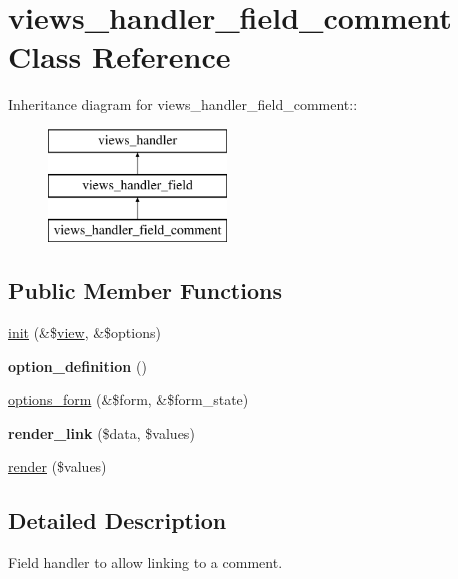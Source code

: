 \hypertarget{classviews__handler__field__comment}{
\section{views\_\-handler\_\-field\_\-comment Class Reference}
\label{classviews__handler__field__comment}
}
Inheritance diagram for views\_\-handler\_\-field\_\-comment::\begin{figure}[H]
\begin{center}
\leavevmode
\includegraphics[height=3cm]{classviews__handler__field__comment}
\end{center}
\end{figure}
\subsection*{Public Member Functions}
\begin{DoxyCompactItemize}
\item 
\hyperlink{classviews__handler__field__comment_a284d26dff5d2ddba3a2f692bf375d770}{init} (\&\$\hyperlink{classview}{view}, \&\$options)
\item 
\hypertarget{classviews__handler__field__comment_a73136303aae33442ce2ea156c1262b22}{
{\bfseries option\_\-definition} ()}
\label{classviews__handler__field__comment_a73136303aae33442ce2ea156c1262b22}

\item 
\hyperlink{classviews__handler__field__comment_a5afe1cb8daaae349f0f39b9ce0195753}{options\_\-form} (\&\$form, \&\$form\_\-state)
\item 
\hypertarget{classviews__handler__field__comment_ad8addc0047740d49844d5c0aa3f05e75}{
{\bfseries render\_\-link} (\$data, \$values)}
\label{classviews__handler__field__comment_ad8addc0047740d49844d5c0aa3f05e75}

\item 
\hyperlink{classviews__handler__field__comment_ac5e0fecfcd448920e3d837c1daed59fa}{render} (\$values)
\end{DoxyCompactItemize}


\subsection{Detailed Description}
Field handler to allow linking to a comment. 

